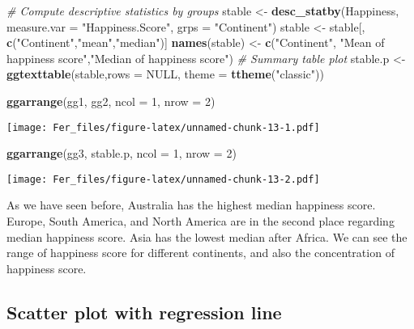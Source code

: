 \documentclass[
]{article}
\newenvironment{Shaded}{\begin{snugshade}}{\end{snugshade}}
\newcommand{\AttributeTok}[1]{\textcolor[rgb]{0.13,0.29,0.53}{#1}}
\newcommand{\CommentTok}[1]{\textcolor[rgb]{0.56,0.35,0.01}{\textit{#1}}}
\newcommand{\ConstantTok}[1]{\textcolor[rgb]{0.56,0.35,0.01}{#1}}
\newcommand{\DecValTok}[1]{\textcolor[rgb]{0.00,0.00,0.81}{#1}}
\newcommand{\FunctionTok}[1]{\textcolor[rgb]{0.13,0.29,0.53}{\textbf{#1}}}
\newcommand{\NormalTok}[1]{#1}
\newcommand{\OtherTok}[1]{\textcolor[rgb]{0.56,0.35,0.01}{#1}}
\newcommand{\StringTok}[1]{\textcolor[rgb]{0.31,0.60,0.02}{#1}}
\begin{document}
\begin{Shaded}
\begin{Highlighting}[]
\CommentTok{\# Compute descriptive statistics by groups}
\NormalTok{stable }\OtherTok{\textless{}{-}} \FunctionTok{desc\_statby}\NormalTok{(Happiness, }\AttributeTok{measure.var =} \StringTok{"Happiness.Score"}\NormalTok{,}
                      \AttributeTok{grps =} \StringTok{"Continent"}\NormalTok{)}
\NormalTok{stable }\OtherTok{\textless{}{-}}\NormalTok{ stable[, }\FunctionTok{c}\NormalTok{(}\StringTok{"Continent"}\NormalTok{,}\StringTok{"mean"}\NormalTok{,}\StringTok{"median"}\NormalTok{)]}
\FunctionTok{names}\NormalTok{(stable) }\OtherTok{\textless{}{-}} \FunctionTok{c}\NormalTok{(}\StringTok{"Continent"}\NormalTok{, }\StringTok{"Mean of happiness score"}\NormalTok{,}\StringTok{"Median of happiness score"}\NormalTok{)}
\CommentTok{\# Summary table plot}
\NormalTok{stable.p }\OtherTok{\textless{}{-}} \FunctionTok{ggtexttable}\NormalTok{(stable,}\AttributeTok{rows =} \ConstantTok{NULL}\NormalTok{, }
                         \AttributeTok{theme =} \FunctionTok{ttheme}\NormalTok{(}\StringTok{"classic"}\NormalTok{))}


\FunctionTok{ggarrange}\NormalTok{(gg1, gg2, }\AttributeTok{ncol =} \DecValTok{1}\NormalTok{, }\AttributeTok{nrow =} \DecValTok{2}\NormalTok{)}
\end{Highlighting}
\end{Shaded}

\texttt{[image: Fer\_files/figure-latex/unnamed-chunk-13-1.pdf]}

\begin{Shaded}
\begin{Highlighting}[]
\FunctionTok{ggarrange}\NormalTok{(gg3, stable.p, }\AttributeTok{ncol =} \DecValTok{1}\NormalTok{, }\AttributeTok{nrow =} \DecValTok{2}\NormalTok{)}
\end{Highlighting}
\end{Shaded}

\texttt{[image: Fer\_files/figure-latex/unnamed-chunk-13-2.pdf]}

As we have seen before, Australia has the highest median happiness
score. Europe, South America, and North America are in the second place
regarding median happiness score. Asia has the lowest median after
Africa. We can see the range of happiness score for different
continents, and also the concentration of happiness score.

\subsection{Scatter plot with regression
line}\label{scatter-plot-with-regression-line}
\end{document}
